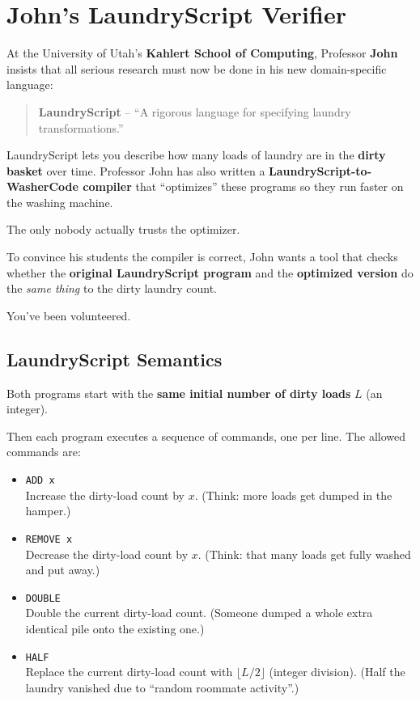 \section*{John's LaundryScript Verifier}

At the University of Utah's \textbf{Kahlert School of Computing}, Professor
\textbf{John} insists that all serious research must now be done in his new
domain-specific language:

\begin{quote}
\textbf{LaundryScript} -- ``A rigorous language for specifying laundry
transformations.''
\end{quote}

LaundryScript lets you describe how many loads of laundry are in the
\textbf{dirty basket} over time. Professor John has also written a
\textbf{LaundryScript-to-WasherCode compiler} that ``optimizes'' these programs
so they run faster on the washing machine.

The only  nobody actually trusts the optimizer.

To convince his students the compiler is correct, John wants a tool that checks
whether the \textbf{original LaundryScript program} and the \textbf{optimized
version} do the \emph{same thing} to the dirty laundry count.

You've been volunteered.

\subsection*{LaundryScript Semantics}

Both programs start with the \textbf{same initial number of dirty loads} \(L\)
(an integer).

Then each program executes a sequence of commands, one per line. The allowed
commands are:
\begin{itemize}
    \item \texttt{ADD x}\\
    Increase the dirty-load count by \(x\). (Think: more loads get dumped in the
    hamper.)

    \item \texttt{REMOVE x}\\
    Decrease the dirty-load count by \(x\). (Think: that many loads get fully
    washed and put away.)

    \item \texttt{DOUBLE}\\
    Double the current dirty-load count. (Someone dumped a whole extra identical
    pile onto the existing one.)

    \item \texttt{HALF}\\
    Replace the current dirty-load count with \(\lfloor L / 2 \rfloor\) (integer
    division). (Half the laundry vanished due to ``random roommate activity''.)
\end{itemize}

